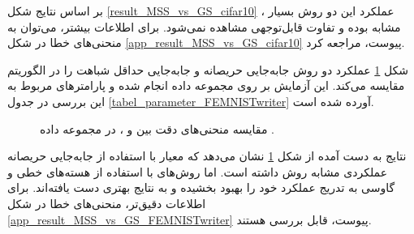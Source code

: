 بر اساس نتایج شکل
\ref{result_MSS_vs_GS_cifar10}%
، عملکرد این دو روش بسیار مشابه بوده و تفاوت قابل‌توجهی مشاهده نمی‌شود. برای اطلاعات بیشتر، می‌توان به منحنی‌های خطا در شکل
\ref{app_result_MSS_vs_GS_cifar10}
پیوست، مراجعه کرد.


شکل
\ref{result_MSS_vs_GS_FEMNISTwriter}
عملکرد دو روش جابه‌جایی حریصانه و جابه‌جایی حداقل شباهت را در الگوریتم
مقایسه می‌کند. این آزمایش بر روی مجموعه داده
انجام شده و پارامترهای مربوط به این بررسی در جدول
\ref{tabel_parameter_FEMNISTwriter}
آورده شده است.


\begin{figure}[t]
	\centering
	\hspace{0.8mm}
	\caption{
		مقایسه منحنی‌های دقت بین
		و
		، در مجموعه داده
		.
	}
	\label{result_MSS_vs_GS_FEMNISTwriter}
\end{figure}



نتایج به دست آمده از شکل
\ref{result_MSS_vs_GS_FEMNISTwriter}
نشان می‌دهد که معیار
با استفاده از جابه‌جایی حریصانه عملکردی مشابه روش
داشته است. اما روش‌های
با استفاده از هسته‌های خطی و گاوسی به تدریج عملکرد خود را بهبود بخشیده و به نتایج بهتری دست یافته‌اند. برای اطلاعات دقیق‌تر، منحنی‌های خطا در شکل
\ref{app_result_MSS_vs_GS_FEMNISTwriter}
پیوست، قابل بررسی هستند.



